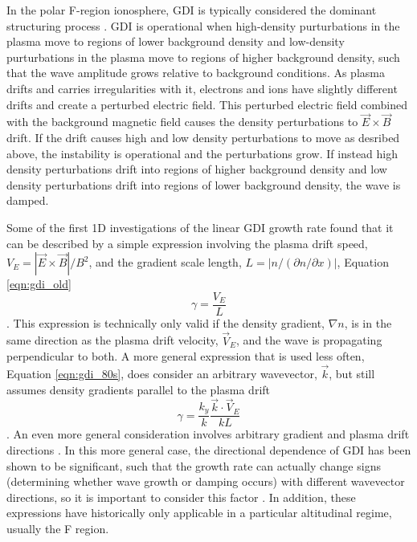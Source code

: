 In the polar F-region ionosphere, GDI is typically considered the dominant structuring process \citep{Weber1984,Cerisier1985,Basu1988,Tsunoda1988}.  GDI is operational when high-density purturbations in the plasma move to regions of lower background density and low-density purturbations in the plasma move to regions of higher background density, such that the wave amplitude grows relative to background conditions.  As plasma drifts and carries irregularities with it, electrons and ions have slightly different drifts and create a perturbed electric field.  This perturbed electric field combined with the background magnetic field causes the density perturbations to \(\vec{E}\times\vec{B}\) drift.  If the drift causes high and low density perturbations to move as desribed above, the instability is operational and the perturbations grow.  If instead high density perturbations drift into regions of higher background density and low density perturbations drift into regions of lower background density, the wave is damped.

Some of the first 1D investigations of the linear GDI growth rate found that it can be described by a simple expression involving the plasma drift speed, \(V_E = |\vec{E}\times\vec{B}|/B^2\), and the gradient scale length, \(L = |n/(\partial n/\partial x)|\), Equation \ref{eqn:gdi_old} \citep{Simon1963,Hoh1963,Linson1970}
\begin{equation}
	\label{eqn:gdi_old}
	\gamma = \frac{V_E}{L}
\end{equation}.
This expression is technically only valid if the density gradient, \(\nabla n\), is in the same direction as the plasma drift velocity, \(\vec{V}_E\), and the wave is propagating perpendicular to both.  A more general expression that is used less often, Equation \ref{eqn:gdi_80s}, does consider an arbitrary wavevector, \(\vec{k}\), but still assumes density gradients parallel to the plasma drift \citep{Tsunoda1988}
\begin{equation}
	\label{eqn:gdi_80s}
	\gamma = \frac{k_y}{k}\frac{\vec{k}\cdot\vec{V}_E}{kL}
\end{equation}.
An even more general consideration involves arbitrary gradient and plasma drift directions \citep{Kesknien1982,Makarevich2014c}.  In this more general case, the directional dependence of GDI has been shown to be significant, such that the growth rate can actually change signs (determining whether wave growth or damping occurs) with different wavevector directions, so it is important to consider this factor \citep{Makarevich2014c}.  In addition, these expressions have historically only applicable in a particular altitudinal regime, usually the F region.

